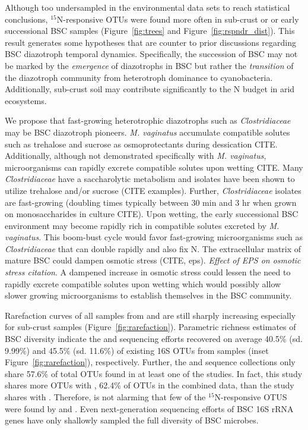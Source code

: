 Although too undersampled in the environmental data sets to reach statistical
conclusions, $^{15}$N-responsive OTUs were found more often in sub-crust or
or early successional BSC samples (Figure~\ref{fig:trees} and
Figure~\ref{fig:rspndr_dist}).  This result generates some hypotheses that are
counter to prior discussions regarding BSC diazotroph temporal dynamics.
Specifically, the succession of BSC may not be marked by the \textit{emergence}
of diazotrophs in BSC but rather the \textit{transition} of the diazotroph
community from heterotroph dominance to cyanobacteria.  Additionally,
sub-crust soil may contribute significantly to the N budget in arid ecosystems.

We propose that fast-growing heterotrophic diazotrophs such as
\textit{Clostridiaceae} may be BSC diazotroph pioneers. \textit{M. vaginatus}
accumulate compatible solutes such as trehalose and sucrose as osmoprotectants
during dessication CITE. Additionally, although not demonstrated specifically
with \textit{M. vaginatus}, microorganisms can rapidly excrete compatible
solutes upon wetting CITE. Many \textit{Clostridiaceae} have a saccharolytic
metabolism and  isolates have been shown to utilize
trehalose and/or sucrose (CITE examples). Further, \textit{Clostridiaceae}
isolates are fast-growing (doubling times typically between 30 min
and 3 hr when grown on monosaccharides in culture CITE). Upon wetting, the
early successional BSC environment may become rapidly rich in compatible
solutes excreted by \textit{M. vaginatus}. This boom-bust cycle would favor
fast-growing microorganisms such as \textit{Clostridiaceae} that can double
rapidly and also fix N. The extracellular matrix of mature BSC could
dampen osmotic stress (CITE, eps). \textit{Effect of EPS on osmotic stress
citation}. A dampened increase in osmotic stress could lessen the need to
rapidly excrete compatible solutes upon wetting which would possibly allow
slower growing microorganisms to establish themselves in the BSC community.

Rarefaction curves of all samples from \citet{Steven_2013} and
\citet{Garcia_Pichel_2013} are still sharply increasing especially for
sub-crust samples (Figure~\ref{fig:rarefaction}). Parametric richness estimates
of BSC diversity indicate the \citet{Steven_2013} and
\citet{Garcia_Pichel_2013} sequencing efforts recovered on average 40.5\% (sd.
9.99\%) and 45.5\% (sd.  11.6\%) of existing 16S OTUs from samples (inset
Figure~\ref{fig:rarefaction}), respectively. Further, the \citet{Steven_2013}
and \citet{Garcia_Pichel_2013} sequence collections only share 57.6\% of total
OTUs found in at least one of the studies. In fact, this study shares more OTUs
with \citet{Steven_2013}, 62.4\% of OTUs in the combined data, than the
\citet{Steven_2013} study shares with \citet{Garcia_Pichel_2013}.  Therefore,
is not alarming that few of the $^{15}$N-responsive OTUS were found by
\citet{Garcia_Pichel_2013} and \citet{Steven_2013}. Even next-generation
sequencing efforts of BSC 16S rRNA genes have only shallowly sampled the full
diversity of BSC microbes.  

